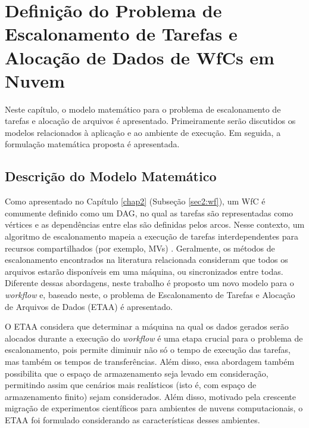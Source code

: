 \chapter{Definição do Problema de Escalonamento de Tarefas e Alocação de Dados de WfCs em Nuvem}\label{chap4}


Neste capítulo, o modelo matemático para o problema de escalonamento de tarefas e alocação de arquivos é apresentado. Primeiramente serão discutidos os modelos relacionados à aplicação e ao ambiente de execução. Em seguida, a formulação matemática proposta é apresentada.


\section{Descrição do Modelo Matemático}

Como apresentado no Capítulo \ref{chap2} (Subseção \ref{sec2:wf}), um WfC é comumente definido como um DAG, no qual as tarefas são representadas como vértices e as dependências entre elas são definidas pelos arcos. Nesse contexto, um algoritmo de escalonamento mapeia a execução de tarefas interdependentes para recursos compartilhados (por exemplo, MVs) \cite{workflow-based-sch}. Geralmente, os métodos de escalonamento encontrados na literatura relacionada consideram que todos os arquivos estarão disponíveis em uma máquina, ou sincronizados entre todas. Diferente dessas abordagens, neste trabalho é proposto um novo modelo para o \textit{workflow} e, baseado neste, o problema de Escalonamento de Tarefas e Alocação de Arquivos de Dados (ETAA) é apresentado. 

O ETAA considera que determinar a máquina na qual os dados gerados serão alocados durante a execução do \textit{workflow} é uma etapa crucial para o problema de escalonamento, pois permite diminuir não só o tempo de execução das tarefas, mas também os tempos de transferências. Além disso, essa abordagem também possibilita que o espaço de armazenamento seja levado em consideração, permitindo assim que cenários mais realísticos (isto é, com espaço de armazenamento finito) sejam considerados. Além disso, motivado pela crescente migração de experimentos científicos para ambientes de nuvens computacionais, o ETAA foi formulado considerando as características desses ambientes.  

